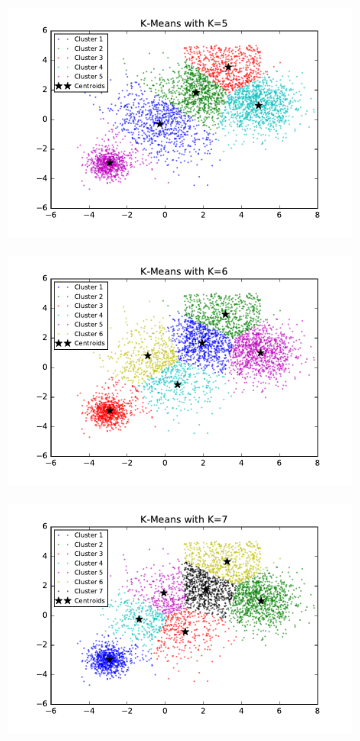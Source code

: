\begin{description}
\begin{figure}[htb]
\begin{subfigure}[b]{0.475\textwidth}
            \includegraphics[width=\textwidth]{./figures/bigClustering_kMeans_5.pdf}
        \end{subfigure}
        \hfill
        \begin{subfigure}[b]{0.475\textwidth}   
            \centering 
            \includegraphics[width=\textwidth]{./figures/bigClustering_kMeans_6.pdf}
        \end{subfigure}
        \begin{subfigure}[b]{0.475\textwidth}   
            \centering 
            \includegraphics[width=\textwidth]{./figures/bigClustering_kMeans_7.pdf}

\end{subfigure}
\end{figure}
\end{description}
